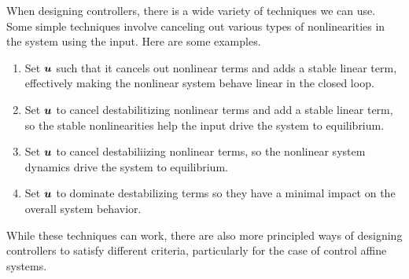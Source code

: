 When designing controllers, there is a wide variety of techniques we can use.
Some simple techniques involve canceling out various types of nonlinearities in
the system using the input. Here are some examples.
\begin{enumerate}
	\item Set $\boldsymbol{u}$ such that it cancels out nonlinear terms and adds a stable
		linear term, effectively making the nonlinear system behave linear in the
		closed loop.
	\item Set $\boldsymbol{u}$ to cancel destabilitizing nonlinear terms and add a stable
		linear term, so the stable nonlinearities help the input drive the system to
		equilibrium.
	\item Set $\boldsymbol{u}$ to cancel destabiliizing nonlinear terms, so the nonlinear
		system dynamics drive the system to equilibrium.
	\item Set $\boldsymbol{u}$ to dominate destabilizing terms so they have a minimal
		impact on the overall system behavior.
\end{enumerate}
While these techniques can work, there are also more principled ways of
designing controllers to satisfy different criteria, particularly for the case
of control affine systems.
